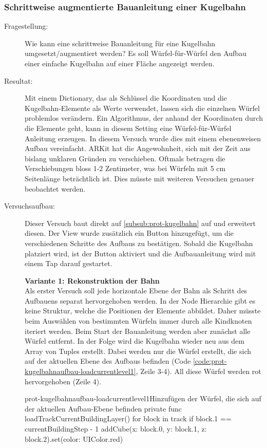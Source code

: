 \subsubsection{Schrittweise augmentierte Bauanleitung einer Kugelbahn}\label{subsub:prot-kugelbahnaufbau}
\begin{description}
	\item[Fragestellung:] Wie kann eine schrittweise Bauanleitung für eine Kugelbahn umgesetzt/augmentiert werden? Es soll Würfel-für-Würfel den Aufbau einer einfache Kugelbahn auf einer Fläche angezeigt werden.
	\item[Resultat:] Mit einem Dictionary, das als Schlüssel die Koordinaten und die Kugelbahn-Elemente als Werte verwendet, lassen sich die einzelnen Würfel problemlos verändern. Ein Algorithmus, der anhand der Koordinaten durch die Elemente geht, kann in diesem Setting eine Würfel-für-Würfel Anleitung erzeugen. In diesem Versuch wurde dies mit einem ebenenweisen Aufbau vereinfacht. ARKit hat die Angewohnheit, sich mit der Zeit aus bislang unklaren Gründen zu verschieben. Oftmals betragen die Verschiebungen bloss 1-2 Zentimeter, was bei Würfeln mit 5 cm Seitenlänge beträchtlich ist. Dies müsste mit weiteren Versuchen genauer beobachtet werden.
	\item[Versuchsaufbau:] Dieser Versuch baut direkt auf \ref{subsub:prot-kugelbahn} auf und erweitert diesen. Der View wurde zusätzlich ein Button hinzugefügt, um die verschiedenen Schritte des Aufbaus zu bestätigen. Sobald die Kugelbahn platziert wird, ist der Button aktiviert und die Aufbauanleitung wird mit einem Tap darauf gestartet.

	\textbf{Variante 1: Rekonstruktion der Bahn}\\
	Als erster Versuch soll jede horizontale Ebene der Bahn als Schritt des Aufbauens separat hervorgehoben werden. In der Node Hierarchie gibt es keine Struktur, welche die Positionen der Elemente abbildet. Daher müsste beim Auswählen von bestimmten Würfeln immer durch alle Kindknoten iteriert werden. Beim Start der Bauanleitung werden aber zunächst alle Würfel entfernt. In der Folge wird die Kugelbahn wieder neu aus dem Array von Tuples erstellt. Dabei werden nur die Würfel erstellt, die sich auf der aktuellen Ebene des Aufbaus befinden (Code \ref{code:prot-kugelbahnaufbau-loadcurrentlevel1}, Zeile 3-4). All diese Würfel werden rot hervorgehoben (Zeile 4).

	\begin{code}{prot-kugelbahnaufbau-loadcurrentlevel1}{Hinzufügen der Würfel, die sich auf der aktuellen Aufbau-Ebene befinden}
	private func loadTrackCurrentBuildingLayer() {
		for block in track {
			if block.1 == currentBuildingStep - 1 {
				addCube(x: block.0, y: block.1, z: block.2).set(color: UIColor.red)
			}
		}
	}
	\end{code}


\end{description}
